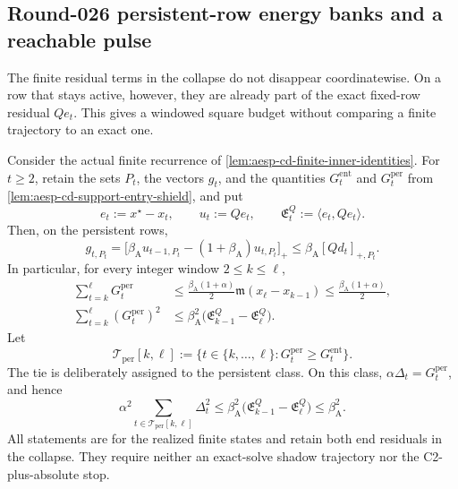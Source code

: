 \subsection{Round-026 persistent-row energy banks and a reachable pulse}

The finite residual terms in the collapse do not disappear coordinatewise.
On a row that stays active, however, they are already part of the exact
fixed-row residual $Qe_t$.  This gives a windowed square budget without
comparing a finite trajectory to an exact one.

\begin{lemma}
\label{lem:aesp-cd-persistent-square-ledger}
Consider the actual finite recurrence of
\cref{lem:aesp-cd-finite-inner-identities}.  For $t\geq2$, retain the sets
$P_t$, the vectors $g_t$, and the quantities $G_t^{\mathrm{ent}}$ and
$G_t^{\mathrm{per}}$ from
\cref{lem:aesp-cd-support-entry-shield}, and put
\begin{equation*}
 e_t:=x^\star-x_t,
 \qquad u_t:=Qe_t,
 \qquad \mathfrak E_t^Q:=\langle e_t,Qe_t\rangle.
\end{equation*}
Then, on the persistent rows,
\begin{equation}
 g_{t,P_t}
 =\bigl[\beta_{\mathrm A}u_{t-1,P_t}
        -(1+\beta_{\mathrm A})u_{t,P_t}\bigr]_+
 \leq\beta_{\mathrm A}[Qd_t]_{+,P_t}.
 \label{eq:aesp-cd-persistent-driver-bound}
\end{equation}
In particular, for every integer window $2\leq k\leq \ell$,
\begin{align}
 \sum_{t=k}^{\ell}G_t^{\mathrm{per}}
 &\leq
 \frac{\beta_{\mathrm A}(1+\alpha)}2
 \mathfrak m(x_\ell-x_{k-1})
 \leq\frac{\beta_{\mathrm A}(1+\alpha)}2,
 \label{eq:aesp-cd-persistent-l1-window}\\
 \sum_{t=k}^{\ell}(G_t^{\mathrm{per}})^2
 &\leq\beta_{\mathrm A}^2
 \bigl(\mathfrak E_{k-1}^Q-\mathfrak E_\ell^Q\bigr).
 \label{eq:aesp-cd-persistent-square-window}
\end{align}
Let
\begin{equation*}
 \mathcal T_{\mathrm{per}}[k,\ell]
 :=\{t\in\{k,\ldots,\ell\}:
       G_t^{\mathrm{per}}\geq G_t^{\mathrm{ent}}\}.
\end{equation*}
The tie is deliberately assigned to the persistent class.  On this class,
$\alpha\Delta_t=G_t^{\mathrm{per}}$, and hence
\begin{equation}
 \alpha^2\sum_{t\in\mathcal T_{\mathrm{per}}[k,\ell]}
       \Delta_t^2
 \leq\beta_{\mathrm A}^2
       \bigl(\mathfrak E_{k-1}^Q-\mathfrak E_\ell^Q\bigr)
 \leq\beta_{\mathrm A}^2.
 \label{eq:aesp-cd-persistent-delta-square-window}
\end{equation}
All statements are for the realized finite states and retain both end
residuals in the collapse.  They require neither an exact-solve shadow
trajectory nor the C2-plus-absolute stop.
\end{lemma}

